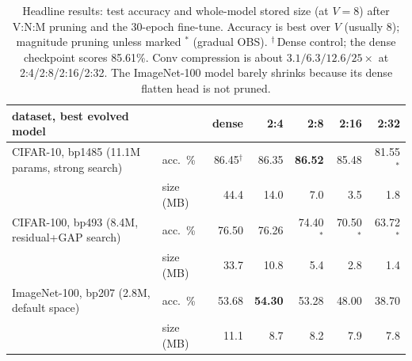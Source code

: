 \documentclass[10pt,a4paper]{article}
\newcommand{\B}[1]{\textbf{#1}}
\begin{document}
\begin{table}[tbp]
\centering\small
\setlength{\tabcolsep}{4.5pt}
\begin{tabular}{llrrrrr}
\toprule
dataset, best evolved model & & dense & 2:4 & 2:8 & 2:16 & 2:32\\
\midrule
CIFAR-10, bp1485 (11.1M params, strong search) & acc.\ \% & 86.45$^\dagger$ & 86.35 & \B{86.52} & 85.48 & 81.55$^\ast$\\
 & size (MB) & 44.4 & 14.0 & 7.0 & 3.5 & 1.8\\
CIFAR-100, bp493 (8.4M, residual+GAP search) & acc.\ \% & 76.50 & 76.26 & 74.40$^\ast$ & 70.50$^\ast$ & 63.72$^\ast$\\
 & size (MB) & 33.7 & 10.8 & 5.4 & 2.8 & 1.4\\
ImageNet-100, bp207 (2.8M, default space) & acc.\ \% & 53.68 & \B{54.30} & 53.28 & 48.00 & 38.70\\
 & size (MB) & 11.1 & 8.7 & 8.2 & 7.9 & 7.8\\
\bottomrule
\end{tabular}
\caption{Headline results: test accuracy and whole-model stored size (at $V{=}8$) after V:N:M pruning and the 30-epoch fine-tune. Accuracy is best over $V$ (usually 8); magnitude pruning unless marked $^\ast$ (gradual OBS). $^\dagger$\,Dense control; the dense checkpoint scores 85.61\%. Conv compression is about $3.1/6.3/12.6/25\times$ at 2:4/2:8/2:16/2:32. The ImageNet-100 model barely shrinks because its dense flatten head is not pruned.}
\label{tab:main}
\end{table}
\end{document}
